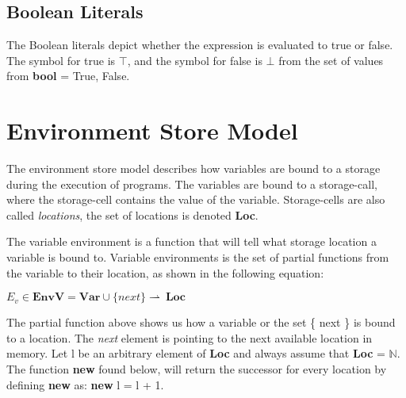   \subsection{Boolean Literals}
  The Boolean literals depict whether the expression is evaluated to true or false. The symbol for true is \begin{math} \top \end{math}, and the symbol for false is \begin{math} \bot \end{math} from the set of values from \textbf{bool} = {True, False}.
  
  
  
  
  
  \section{Environment Store Model}
  The environment store model describes how variables are bound to a storage during the execution of programs. The variables are bound to a storage-call, where the storage-cell contains the value of the variable. Storage-cells are also called \textit{locations}, the set of locations is denoted \textbf{Loc}.
  
  The variable environment is a function that will tell what storage location a variable is bound to. Variable environments  is the set of partial functions  from the variable to their location, as shown in the following equation:
  
  \begin{math}  
	 E_v \in \boldsymbol{EnvV} = \boldsymbol{Var} \cup \{ next \} \rightharpoonup \ \boldsymbol{Loc}
  \end{math}
  
  The partial function above shows us how a variable or the set \{ next \} is bound to a location. The \textit{next} element is pointing to the next available location in memory.
  Let l be an arbitrary element of \textbf{Loc} and always assume that \textbf{Loc} = \begin{math} \mathbb{N}. \end{math} The function \textbf{new} found below, will return the successor for every location by defining \textbf{new} as: \textbf{new} l = l + 1.
  
